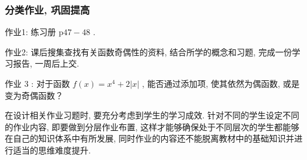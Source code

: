 \subsubsection{分类作业, 巩固提高}
作业1: 练习册 p$47-48$ .

作业2: 课后搜集查找有关函数奇偶性的资料, 结合所学的概念和习题, 完成一份学习报告, 一周后上交.

作业 3 : 对于函数 $f(x)=x^{4}+2|x|$ , 能否通过添加项, 使其依然为偶函数, 或是变为奇偶函数？

\begin{purpose}
	在设计相关作业习题时, 要充分考虑到学生的学习成效. 针对不同的学生设定不同的作业内容, 即要做到分层作业布置, 这样才能够确保处于不同层次的学生都能够在自己的知识体系中有所发展, 同时作业的内容还不能脱离教材中的基础知识并进行适当的思维难度提升.
\end{purpose}